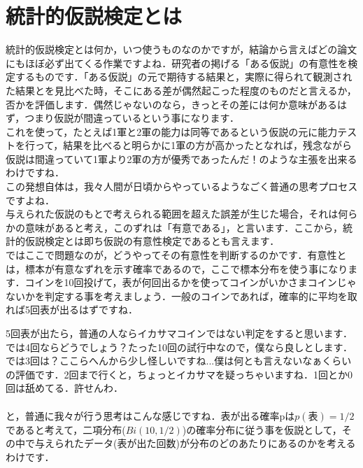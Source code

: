 \documentclass[11pt,a4paper,uplatex]{ujreport} 	%
\begin{document}
\section{統計的仮説検定とは}
統計的仮説検定とは何か，いつ使うものなのかですが，結論から言えばどの論文にもほぼ必ず出てくる作業ですよね．研究者の掲げる「ある仮説」の有意性を検定するものです．「ある仮説」の元で期待する結果と，実際に得られて観測された結果とを見比べた時，そこにある差が偶然起こった程度のものだと言えるか，否かを評価します．偶然じゃないのなら，きっとその差には何か意味があるはず，つまり仮説が間違っているという事になります．\\

これを使って，たとえば1軍と2軍の能力は同等であるという仮説の元に能力テストを行って，結果を比べると明らかに1軍の方が高かったとなれば，残念ながら仮説は間違っていて1軍より2軍の方が優秀であったんだ！のような主張を出来るわけですね．\\

この発想自体は，我々人間が日頃からやっているようなごく普通の思考プロセスですよね．\\

与えられた仮説のもとで考えられる範囲を超えた誤差が生じた場合，それは何らかの意味があると考え，このずれは「有意である」，と言います．ここから，統計的仮説検定とは即ち仮説の有意性検定であるとも言えます．\\

ではここで問題なのが，どうやってその有意性を判断するのかです．有意性とは，標本が有意なずれを示す確率であるので，ここで標本分布を使う事になります．コインを10回投げて，表が何回出るかを使ってコインがいかさまコインじゃないかを判定する事を考えましょう．一般のコインであれば，確率的に平均を取れば5回表が出るはずですね．

5回表が出たら，普通の人ならイカサマコインではない判定をすると思います．では4回ならどうでしょう？たった10回の試行中なので，僕なら良しとします．では3回は？ここらへんから少し怪しいですね...僕は何とも言えないなぁくらいの評価です．2回まで行くと，ちょっとイカサマを疑っちゃいますね．1回とか0回は舐めてる．許せんわ．\\\\

と，普通に我々が行う思考はこんな感じですね．表が出る確率pは$p(表)=1/2$であると考えて，二項分布($Bi(10,1/2)$)の確率分布に従う事を仮説として，その中で与えられたデータ(表が出た回数)が分布のどのあたりにあるのかを考えるわけです．
\end{document}
